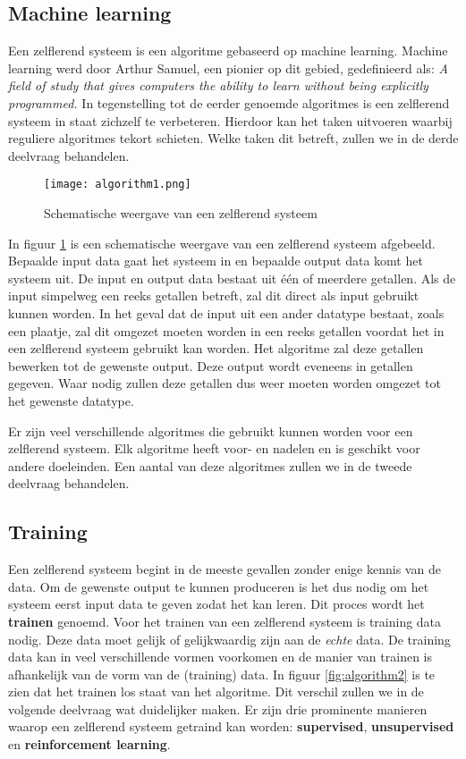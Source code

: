 \subsection{Machine learning}
Een zelflerend systeem is een algoritme gebaseerd op machine learning. Machine learning werd door Arthur Samuel, een pionier op dit gebied, gedefinieerd als: 
\textit{A field of study that gives computers the ability to learn without being explicitly programmed.} \cite{ArthurSamuel} 
In tegenstelling tot de eerder genoemde algoritmes is een zelflerend systeem in staat zichzelf te verbeteren. Hierdoor kan het taken uitvoeren waarbij reguliere algoritmes tekort schieten. Welke taken dit betreft, zullen we in de derde deelvraag behandelen. 

\begin{figure}[h]
  \centering
    \texttt{[image: algorithm1.png]}
  \caption{Schematische weergave van een zelflerend systeem}
  \label{fig:algorithm1}
\end{figure}

In figuur \ref{fig:algorithm1}  is een schematische weergave van een zelflerend systeem afgebeeld. Bepaalde input data gaat het systeem in en bepaalde output data komt het systeem uit. De input en output data bestaat uit \'e\'en of meerdere getallen. Als de input simpelweg een reeks getallen betreft, zal dit direct als input gebruikt kunnen worden. In het geval dat de input uit een ander datatype bestaat, zoals een plaatje, zal dit omgezet moeten worden in een reeks getallen voordat het in een zelflerend systeem gebruikt kan worden. Het algoritme zal deze getallen bewerken tot de gewenste output. Deze output wordt eveneens in getallen gegeven. Waar nodig zullen deze getallen dus weer moeten worden omgezet tot het gewenste datatype.

Er zijn veel verschillende algoritmes die gebruikt kunnen worden voor een zelflerend systeem. Elk algoritme heeft voor- en nadelen en is geschikt voor andere doeleinden. Een aantal van deze algoritmes zullen we in de tweede deelvraag behandelen. 

\subsection{Training}

Een zelflerend systeem begint in de meeste gevallen zonder enige kennis van de data. Om de gewenste output te kunnen produceren is het dus nodig om het systeem eerst input data te geven zodat het kan leren. Dit proces wordt het \textbf{trainen} genoemd. Voor het trainen van een zelflerend systeem is training data nodig. Deze data moet gelijk of gelijkwaardig zijn aan de \textit{echte} data. De training data kan in veel verschillende vormen voorkomen en de manier van trainen is afhankelijk van de vorm van de (training) data. In figuur \ref{fig:algorithm2}  is te zien dat het trainen los staat van het algoritme. Dit verschil zullen we in de volgende deelvraag wat duidelijker maken. 
Er zijn drie prominente manieren waarop een zelflerend systeem getraind kan worden: \textbf{supervised}, \textbf{unsupervised} en \textbf{reinforcement learning}.

